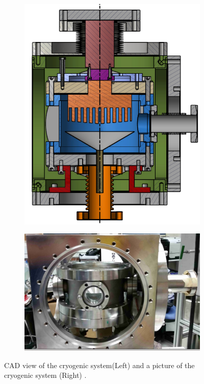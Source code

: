 \begin{figure}[h]
\centering
\begin{subfigure}[c]{0.25\textheight}
\includegraphics[width=\textwidth]{cryoMirror.png}
\end{subfigure}
\begin{subfigure}[c]{0.25\textheight}
\includegraphics[width=\textwidth]{cryoOpenCrop.png}
\end{subfigure}
\caption{ CAD view of the cryogenic system(Left) and a picture of the cryogenic system (Right) . 
\label{fig:cryo}}
\end{figure}

